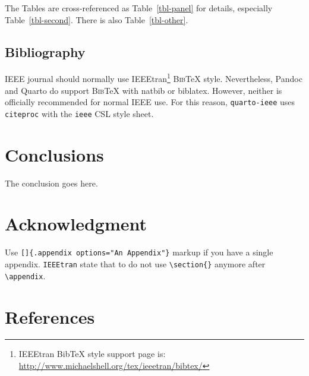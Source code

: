 \documentclass[
  journal,
]{IEEEtran}%
\begin{document}
The Tables are cross-referenced as Table~\ref{tbl-panel} for details,
especially Table~\ref{tbl-second}. There is also Table~\ref{tbl-other}.

\begin{table}

\caption{\label{tbl-other}A table}


\end{table}%

\subsection{Bibliography}\label{bibliography}

IEEE journal should normally use IEEEtran\footnote{IEEEtran BibTeX style
  support page is:
  \url{http://www.michaelshell.org/tex/ieeetran/bibtex/}}
\textsc{Bib}{\TeX} style. Nevertheless, Pandoc and Quarto do support
\textsc{Bib}{\TeX} with natbib or biblatex. However, neither is
officially recommended for normal IEEE use. For this reason,
\texttt{quarto-ieee} uses \texttt{citeproc} with the \texttt{ieee} CSL
style sheet.

\section{Conclusions}\label{conclusions}

The conclusion goes here.

\section*{Acknowledgment}\label{acknowledgment}

\appendix[An Appendix]{}

Use \texttt{{[}{]}\{.appendix\ options="An\ Appendix"\}} markup if you
have a single appendix. \texttt{IEEEtran} state that to do not use
\texttt{\textbackslash{}section\{\}} anymore after
\texttt{\textbackslash{}appendix}.

\section*{References}\label{references}
\end{document}
